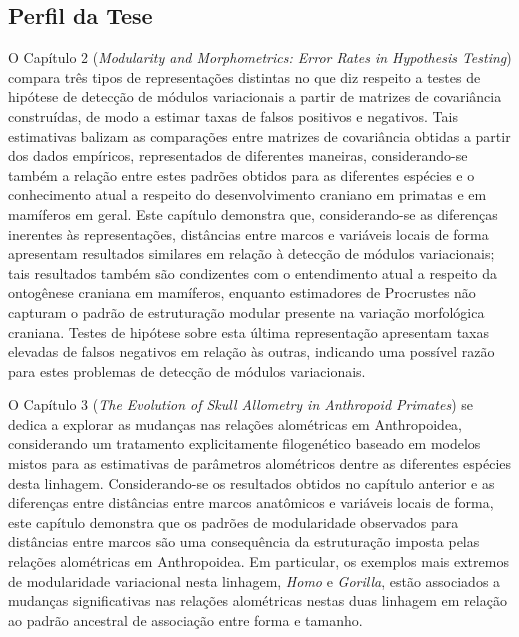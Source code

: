 \documentclass[12pt,twoside]{report}
\begin{document}
\newpage

\subsection{Perfil da Tese}\label{perfil-da-tese}

O Capítulo 2 (\emph{Modularity and Morphometrics: Error Rates in
Hypothesis Testing}) compara três tipos de representações distintas no
que diz respeito a testes de hipótese de detecção de módulos
variacionais a partir de matrizes de covariância construídas, de modo a
estimar taxas de falsos positivos e negativos. Tais estimativas balizam
as comparações entre matrizes de covariância obtidas a partir dos dados
empíricos, representados de diferentes maneiras, considerando-se também
a relação entre estes padrões obtidos para as diferentes espécies e o
conhecimento atual a respeito do desenvolvimento craniano em primatas e
em mamíferos em geral. Este capítulo demonstra que, considerando-se as
diferenças inerentes às representações, distâncias entre marcos e
variáveis locais de forma apresentam resultados similares em relação à
detecção de módulos variacionais; tais resultados também são condizentes
com o entendimento atual a respeito da ontogênese craniana em mamíferos,
enquanto estimadores de Procrustes não capturam o padrão de estruturação
modular presente na variação morfológica craniana. Testes de hipótese
sobre esta última representação apresentam taxas elevadas de falsos
negativos em relação às outras, indicando uma possível razão para estes
problemas de detecção de módulos variacionais.

O Capítulo 3 (\emph{The Evolution of Skull Allometry in Anthropoid
Primates}) se dedica a explorar as mudanças nas relações alométricas em
Anthropoidea, considerando um tratamento explicitamente filogenético
baseado em modelos mistos para as estimativas de parâmetros alométricos
dentre as diferentes espécies desta linhagem. Considerando-se os
resultados obtidos no capítulo anterior e as diferenças entre distâncias
entre marcos anatômicos e variáveis locais de forma, este capítulo
demonstra que os padrões de modularidade observados para distâncias
entre marcos são uma consequência da estruturação imposta pelas relações
alométricas em Anthropoidea. Em particular, os exemplos mais extremos de
modularidade variacional nesta linhagem, \emph{Homo} e \emph{Gorilla},
estão associados a mudanças significativas nas relações alométricas
nestas duas linhagem em relação ao padrão ancestral de associação entre
forma e tamanho.
\end{document}

